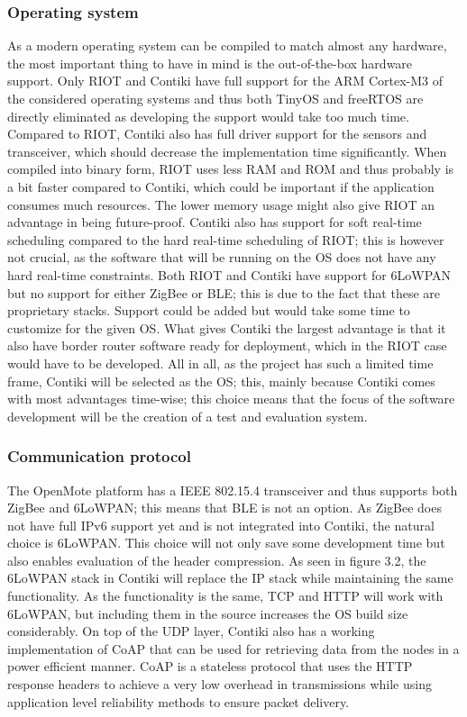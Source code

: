\subsubsection{Operating system}

As a modern operating system can be compiled to match almost any hardware,
	the most important thing to have in mind is the out-of-the-box hardware support.
Only RIOT and Contiki have full support for the ARM Cortex-M3 of the considered operating systems and thus both TinyOS and freeRTOS are directly eliminated as developing the support would take too much time.
Compared to RIOT,
	Contiki also has full driver support for the sensors and transceiver,
	which should decrease the implementation time significantly.
When compiled into binary form,
	RIOT uses less RAM and ROM and thus probably is a bit faster compared to Contiki,
	which could be important if the application consumes much resources.
The lower memory usage might also give RIOT an advantage in being future-proof.
Contiki also has support for soft real-time scheduling compared to the hard real-time scheduling of RIOT;
	this is however not crucial,
	as the software that will be running on the OS does not have any hard real-time constraints.
Both RIOT and Contiki have support for 6LoWPAN but no support for either ZigBee or BLE;
	this is due to the fact that these are proprietary stacks.
Support could be added but would take some time to customize for the given OS.
What gives Contiki the largest advantage is that it also have border router software ready for deployment,
	which in the RIOT case would have to be developed.
All in all,
	as the project has such a limited time frame,
	Contiki will be selected as the OS;
	this,
	mainly because Contiki comes with most advantages time-wise;
	this choice means that the focus of the software development will be the creation of a test and evaluation system.

\subsubsection{Communication protocol}


The OpenMote platform has a IEEE 802.15.4 transceiver and thus supports both ZigBee and 6LoWPAN;
	this means that BLE is not an option.
As ZigBee does not have full IPv6 support yet and is not integrated into Contiki,
	the natural choice is 6LoWPAN.
This choice will not only save some development time but also enables evaluation of the header compression.
As seen in figure 3.2,
	the 6LoWPAN stack in Contiki will replace the IP stack while maintaining the same functionality.
As the functionality is the same,
	TCP and HTTP will work with 6LoWPAN,
	but including them in the source increases the OS build size considerably.
On top of the UDP layer,
	Contiki also has a working implementation of CoAP that can be used for retrieving data from the nodes in a power efficient manner.
CoAP is a stateless protocol that uses the HTTP response headers to achieve a very low overhead in transmissions while using application level reliability methods to ensure packet delivery.

